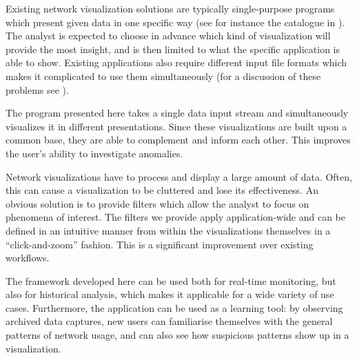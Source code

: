Existing network visualization solutions are typically single-purpose programs which present given data in one specific way (see for instance the catalogue in \cite{marty2009applied}). The analyst is expected to choose in advance which kind of visualization will provide the most insight, and is then limited to what the specific application is able to show. Existing applications also require different input file formats which makes it complicated to use them simultaneously (for a discussion of these problems see ). 

The program presented here takes a single data input stream and simultaneously visualizes it in different presentations. Since these visualizations are built upon a common base, they are able to complement and inform each other. This improves the user's ability to investigate anomalies.

Network visualizations have to process and display a large amount of data. Often, this can cause a visualization to be cluttered and lose its effectiveness. An obvious solution is to provide filters which allow the analyst to focus on phenomena of interest. The filters we provide apply application-wide and can be defined in an intuitive manner from within the visualizations themselves in a ``click-and-zoom'' fashion. This is a significant improvement over existing workflows.

The framework developed here can be used both for real-time monitoring, but also for historical analysis, which makes it applicable for a wide variety of use cases. Furthermore, the application can be used as a learning tool: by observing archived data captures, new users can familiarise themselves with the general patterns of network usage, and can also see how suspicious patterns show up in a visualization.